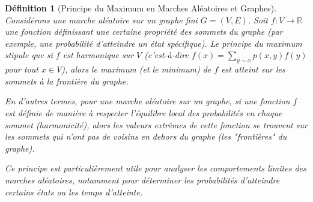 \documentclass{article}
\theoremstyle{pasdepoint}
\newtheorem{definition}{Définition}
\theoremstyle{break}
\theoremstyle{pasdepoint}
\begin{document}
\begin{definition}[Principe du Maximum en Marches Aléatoires et Graphes]
    Considérons une marche aléatoire sur un graphe fini \( G = (V, E) \). Soit \( f: V \rightarrow \mathbb{R} \) une fonction définissant une certaine propriété des sommets du graphe (par exemple, une probabilité d'atteindre un état spécifique). Le principe du maximum stipule que si \( f \) est harmonique sur \( V \) (c'est-à-dire \( f(x) = \sum_{y \sim x} p(x, y) f(y) \) pour tout \( x \in V \)), alors le maximum (et le minimum) de \( f \) est atteint sur les sommets à la frontière du graphe.
    
    En d'autres termes, pour une marche aléatoire sur un graphe, si une fonction \( f \) est définie de manière à respecter l'équilibre local des probabilités en chaque sommet (harmonicité), alors les valeurs extrêmes de cette fonction se trouvent sur les sommets qui n'ont pas de voisins en dehors du graphe (les "frontières" du graphe).
    
    Ce principe est particulièrement utile pour analyser les comportements limites des marches aléatoires, notamment pour déterminer les probabilités d'atteindre certains états ou les temps d'atteinte.
\end{definition}
\end{document}

